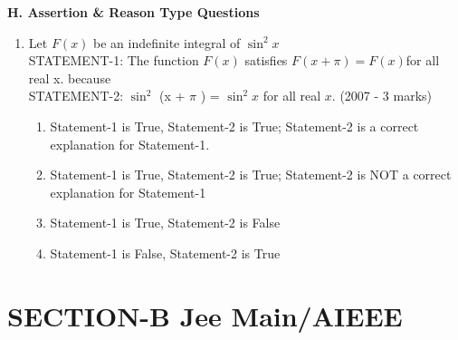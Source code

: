 \documentclass[journal,12pt,twocolumn]{IEEEtran}
\theoremstyle{remark}
\begin{document}
\textbf{ H. Assertion \& Reason Type Questions}\\
 
\begin{enumerate}
\item   Let $F(x)$ be an indefinite integral of $\sin^2 x$\\

STATEMENT-1: The function $F(x)$ satisfies $F(x+\pi)=F(x)$for all real x. because\\
STATEMENT-2: $\sin^2$ (x + $\pi$ ) = $\sin^2 x$ for all real $x$.   \hfill     (2007 - 3 marks)
  
    \begin{enumerate}
    
 \item Statement-1 is True, Statement-2 is True; Statement-2 is a correct explanation for Statement-1.
\item Statement-1 is True, Statement-2 is True; Statement-2 is NOT a correct explanation for Statement-1
 \item Statement-1 is True, Statement-2 is False
\item Statement-1 is False, Statement-2 is True
\end{enumerate}
\end{enumerate} 

\large\large\section{\textbf{{SECTION-B Jee Main/AIEEE}}}\small\small
\end{document}
